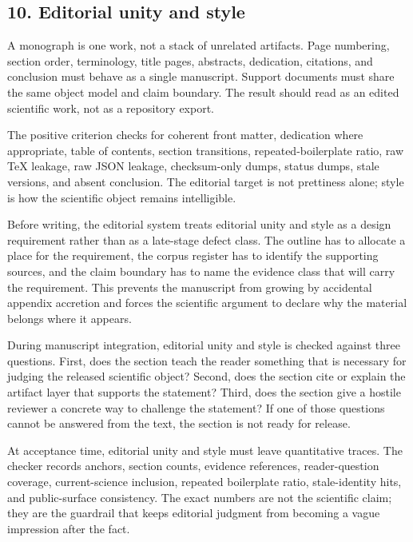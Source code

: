 \subsection{10. Editorial unity and style}

A monograph is one work, not a stack of unrelated artifacts. Page numbering, section order, terminology, title pages, abstracts, dedication, citations, and conclusion must behave as a single manuscript. Support documents must share the same object model and claim boundary. The result should read as an edited scientific work, not as a repository export.


The positive criterion checks for coherent front matter, dedication where appropriate, table of contents, section transitions, repeated-boilerplate ratio, raw TeX leakage, raw JSON leakage, checksum-only dumps, status dumps, stale versions, and absent conclusion. The editorial target is not prettiness alone; style is how the scientific object remains intelligible.


Before writing, the editorial system treats editorial unity and style as a design requirement rather than as a late-stage defect class. The outline has to allocate a place for the requirement, the corpus register has to identify the supporting sources, and the claim boundary has to name the evidence class that will carry the requirement. This prevents the manuscript from growing by accidental appendix accretion and forces the scientific argument to declare why the material belongs where it appears.


During manuscript integration, editorial unity and style is checked against three questions. First, does the section teach the reader something that is necessary for judging the released scientific object? Second, does the section cite or explain the artifact layer that supports the statement? Third, does the section give a hostile reviewer a concrete way to challenge the statement? If one of those questions cannot be answered from the text, the section is not ready for release.


At acceptance time, editorial unity and style must leave quantitative traces. The checker records anchors, section counts, evidence references, reader-question coverage, current-science inclusion, repeated boilerplate ratio, stale-identity hits, and public-surface consistency. The exact numbers are not the scientific claim; they are the guardrail that keeps editorial judgment from becoming a vague impression after the fact.


